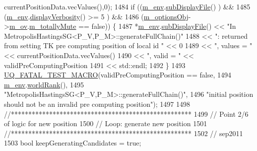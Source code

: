 \begin{DoxyCode}
      currentPositionData.vecValues(),0);
1484     \textcolor{keywordflow}{if} ((\hyperlink{class_q_u_e_s_o_1_1_metropolis_hastings_s_g_ac8ea061e55b920e0c8f9bce5c3f20e52}{m\_env}.\hyperlink{class_q_u_e_s_o_1_1_base_environment_a8a0064746ae8dddfece4229b9ad374d6}{subDisplayFile}()                   ) &&
1485         (\hyperlink{class_q_u_e_s_o_1_1_metropolis_hastings_s_g_ac8ea061e55b920e0c8f9bce5c3f20e52}{m\_env}.\hyperlink{class_q_u_e_s_o_1_1_base_environment_a1fe5f244fc0316a0ab3e37463f108b96}{displayVerbosity}() >= 5            ) &&
1486         (\hyperlink{class_q_u_e_s_o_1_1_metropolis_hastings_s_g_a5d0bc9f73d50d272aa6bfb5ef5939ef3}{m\_optionsObj}->\hyperlink{class_q_u_e_s_o_1_1_metropolis_hastings_s_g_options_a9d4792d9fc2dc5439b8ab489b0c236eb}{m\_ov}.\hyperlink{class_q_u_e_s_o_1_1_mh_options_values_af812309e81191e88dfdc87c5815141a3}{m\_totallyMute} == \textcolor{keyword}{false})) \{
1487       *\hyperlink{class_q_u_e_s_o_1_1_metropolis_hastings_s_g_ac8ea061e55b920e0c8f9bce5c3f20e52}{m\_env}.\hyperlink{class_q_u_e_s_o_1_1_base_environment_a8a0064746ae8dddfece4229b9ad374d6}{subDisplayFile}() << \textcolor{stringliteral}{"In MetropolisHastingsSG<P\_V,P\_M>::generateFullChain()"}
1488                               << \textcolor{stringliteral}{": returned from setting TK pre computing position of local id "} << 0
1489                               << \textcolor{stringliteral}{", values = "} << currentPositionData.vecValues()
1490                               << \textcolor{stringliteral}{", valid = "}  << validPreComputingPosition
1491                               << std::endl;
1492     \}
1493     \hyperlink{_defines_8h_a56d63d18d0a6d45757de47fcc06f574d}{UQ\_FATAL\_TEST\_MACRO}(validPreComputingPosition == \textcolor{keyword}{false},
1494                         \hyperlink{class_q_u_e_s_o_1_1_metropolis_hastings_s_g_ac8ea061e55b920e0c8f9bce5c3f20e52}{m\_env}.\hyperlink{class_q_u_e_s_o_1_1_base_environment_a78b57112bbd0e6dd0e8afec00b40ffa7}{worldRank}(),
1495                         \textcolor{stringliteral}{"MetropolisHastingsSG<P\_V,P\_M>::generateFullChain()"},
1496                         \textcolor{stringliteral}{"initial position should not be an invalid pre computing position"});
1497 
1498     \textcolor{comment}{//****************************************************}
1499     \textcolor{comment}{// Point 2/6 of logic for new position}
1500     \textcolor{comment}{// Loop: generate new position}
1501     \textcolor{comment}{//****************************************************}
1502     \textcolor{comment}{// sep2011}
1503     \textcolor{keywordtype}{bool} keepGeneratingCandidates = \textcolor{keyword}{true};

\end{DoxyCode}
